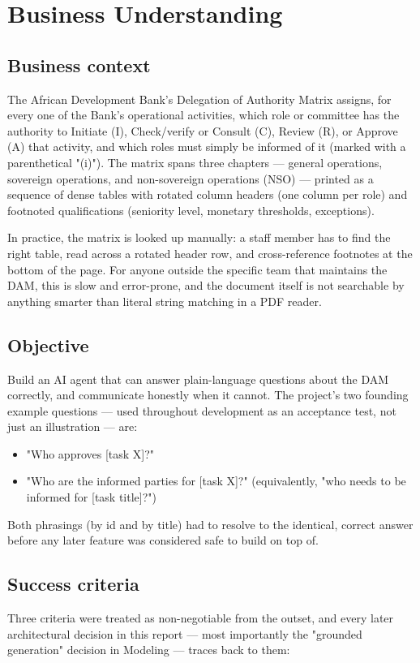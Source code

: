 \chapter{Business Understanding}
\label{ch:business-understanding}
\section{Business context}
The African Development Bank's Delegation of Authority Matrix assigns, for every one of the Bank's operational activities, which role or committee has the authority to Initiate (I), Check/verify or Consult (C), Review (R), or Approve (A) that activity, and which roles must simply be informed of it (marked with a parenthetical "(i)"). The matrix spans three chapters — general operations, sovereign operations, and non-sovereign operations (NSO) — printed as a sequence of dense tables with rotated column headers (one column per role) and footnoted qualifications (seniority level, monetary thresholds, exceptions).

In practice, the matrix is looked up manually: a staff member has to find the right table, read across a rotated header row, and cross-reference footnotes at the bottom of the page. For anyone outside the specific team that maintains the DAM, this is slow and error-prone, and the document itself is not searchable by anything smarter than literal string matching in a PDF reader.

\section{Objective}
Build an AI agent that can answer plain-language questions about the DAM correctly, and communicate honestly when it cannot. The project's two founding example questions — used throughout development as an acceptance test, not just an illustration — are:

\begin{itemize}
\item "Who approves [task X]?"
\item "Who are the informed parties for [task X]?" (equivalently, "who needs to be informed for [task title]?")
\end{itemize}
Both phrasings (by id and by title) had to resolve to the identical, correct answer before any later feature was considered safe to build on top of.

\section{Success criteria}
Three criteria were treated as non-negotiable from the outset, and every later architectural decision in this report — most importantly the "grounded generation" decision in Modeling — traces back to them:

